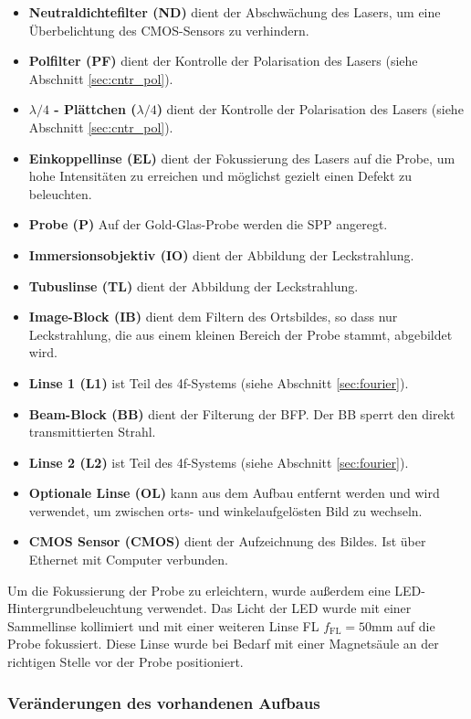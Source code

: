 \documentclass[titlepage]{article}
\begin{document}
		\begin{itemize}
			\item \textbf{Neutraldichtefilter (ND)} dient der Abschwächung des Lasers, um eine Überbelichtung des CMOS-Sensors zu verhindern.
			\item \textbf{Polfilter (PF)} dient der Kontrolle der Polarisation des Lasers (siehe Abschnitt \ref{sec:cntr_pol}).
			\item \textbf{$\lambda / 4$ - Plättchen ($\lambda / 4$)} dient der Kontrolle der Polarisation des Lasers (siehe Abschnitt \ref{sec:cntr_pol}).
			\item \textbf{Einkoppellinse (EL)} dient der Fokussierung des Lasers auf die Probe, um hohe Intensitäten zu erreichen und möglichst gezielt einen Defekt zu beleuchten.
			\item \textbf{Probe (P)} Auf der Gold-Glas-Probe werden die SPP angeregt.
			\item \textbf{Immersionsobjektiv (IO)} dient der Abbildung der Leckstrahlung.
			\item \textbf{Tubuslinse (TL)} dient der Abbildung der Leckstrahlung.
			\item \textbf{Image-Block (IB)} dient dem Filtern des Ortsbildes, so dass nur Leckstrahlung, die aus einem kleinen Bereich der Probe stammt, abgebildet wird.			
			\item \textbf{Linse 1 (L1)} ist Teil des 4f-Systems (siehe Abschnitt \ref{sec:fourier}).
			\item \textbf{Beam-Block (BB)} dient der Filterung der BFP. Der BB sperrt den direkt transmittierten Strahl.			
			\item \textbf{Linse 2 (L2)} ist Teil des 4f-Systems (siehe Abschnitt \ref{sec:fourier}).
			\item \textbf{Optionale Linse (OL)} kann aus dem Aufbau entfernt werden und wird verwendet, um zwischen orts- und winkelaufgelösten Bild zu wechseln.
			\item \textbf{CMOS Sensor (CMOS)}  dient der Aufzeichnung des Bildes. Ist über Ethernet mit Computer verbunden.			
		\end{itemize}
		Um die Fokussierung der Probe zu erleichtern, wurde außerdem eine LED-Hintergrundbeleuchtung verwendet. Das Licht der LED wurde mit einer Sammellinse kollimiert und mit einer weiteren Linse FL $f_{\mathrm{FL}}=50\mathrm{mm}$ auf die  Probe fokussiert. Diese Linse wurde bei Bedarf mit einer Magnetsäule an der richtigen Stelle vor der Probe positioniert.
		
	\subsubsection{Veränderungen des vorhandenen Aufbaus}
\end{document}
